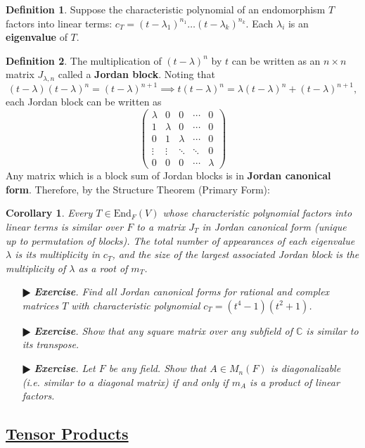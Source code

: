 \documentclass[11pt]{amsart}
\newtheorem*{corollary*}{Corollary}
\theoremstyle{definition}
\newtheorem*{definition*}{Definition}
\renewcommand\:{\colon}
\newcommand{\1}{\mathds{1}}
\newcommand{\End}{\text{End}}
\newcommand{\exc}[1]{\vspace{-2.5pt}\begin{itemize}[leftmargin=15pt]\item[$\RHD$] \textit{\textbf{Exercise}. #1}\end{itemize}}
\begin{document}
\begin{definition*}
	Suppose the characteristic polynomial of an endomorphism $T$ factors into linear terms: $c_T = (t - \lambda_1)^{n_1}\dots(t - \lambda_k)^{n_k}$. Each $\lambda_i$ is an \textbf{eigenvalue} of $T$. 
\end{definition*}

\begin{definition*}
	The multiplication of $(t - \lambda)^n$ by $t$ can be written as an $n \times n$ matrix $J_{\lambda, n}$ called a \textbf{Jordan block}. Noting that 
		\[ (t - \lambda)(t - \lambda)^n = (t - \lambda)^{n+1} \implies t(t - \lambda)^n = \lambda(t - \lambda)^n + (t - \lambda)^{n+1}, \]
	each Jordan block can be written as
		\[ \begin{pmatrix} \lambda & 0 & 0 & \cdots & 0 \\ 1 & \lambda & 0 & \cdots & 0 \\ 0 & 1 & \lambda & \cdots & 0 \\ \vdots & \vdots & \ddots & \ddots & 0 \\ 0 & 0 & 0 & \cdots & \lambda \end{pmatrix} \]
	Any matrix which is a block sum of Jordan blocks is in \textbf{Jordan canonical form}. Therefore, by the Structure Theorem (Primary Form):
\end{definition*}

\begin{corollary*}
	Every $T \in \End_F(V)$ whose characteristic polynomial factors into linear terms is similar over $F$ to a matrix $J_T$ in Jordan canonical form \textnormal{(}unique up to permutation of blocks\textnormal{)}. The total number of appearances of each eigenvalue $\lambda$ is its multiplicity in $c_T$, and the size of the largest associated Jordan block is the multiplicity of $\lambda$ as a root of $m_T$.
\end{corollary*}

\exc{Find all Jordan canonical forms for rational and complex matrices $T$ with characteristic polynomial $c_T = (t^4 - 1)(t^2 + 1)$.}
\exc{Show that any square matrix over any subfield of $\mathds C$ is similar to its transpose.}
\exc{Let $F$ be any field. Show that $A \in M_n(F)$ is diagonalizable \textnormal{(}i.e. similar to a diagonal matrix\textnormal{)} if and only if $m_A$ is a product of linear factors.}

\vskip60pt



\subsection*{\underline{Tensor Products}}
\end{document}
